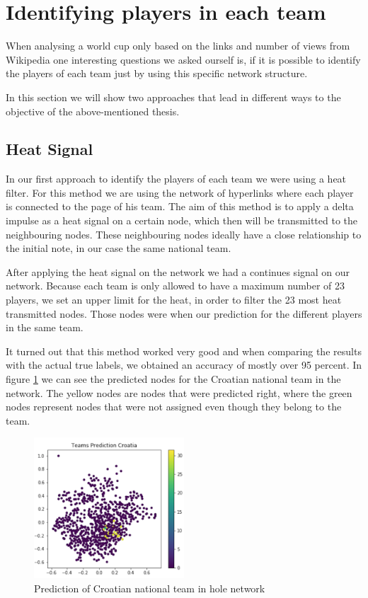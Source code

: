 \documentclass[12pt,a4paper, twocolumn]{article}
\begin{document}
\section{Identifying players in each team}
When analysing a world cup only based on the links and number of views from Wikipedia one interesting questions we asked ourself is, if it is possible to identify the players of each team just by using this specific network structure. 

In this section we will show two approaches that lead in different ways to the objective of the above-mentioned thesis. 

\subsection{Heat Signal}
In our first approach to identify the players of each team we were using a heat filter. For this method we are using the network of hyperlinks where each player is connected to the page of his team. The aim of this method is to apply a delta impulse as a heat signal on a certain node, which then will be transmitted to the neighbouring nodes. These neighbouring nodes ideally have a close relationship to the initial note, in our case the same national team. 
\par
After applying the heat signal on the network we had a continues signal on our network. Because each team is only allowed to have a maximum number of 23 players, we set an upper limit for the heat, in order to filter the 23 most heat transmitted nodes. Those nodes were when our prediction for the different players in the same team. 
\par
It turned out that this method worked very good and when comparing the results with the actual true labels, we obtained an accuracy of mostly over 95 percent. In figure \ref{fig:cluster_4} we can see the predicted nodes for the Croatian national team in the network. The yellow nodes are nodes that were predicted right, where the green nodes represent nodes that were not assigned even though they belong to the team.  

\begin{figure}[h!]
	\centering
	\includegraphics[width=0.5\textwidth]{ClusterCroatia.png}
	\caption{Prediction of Croatian national team in hole network}
	\label{fig:cluster_4}
\end{figure}
\end{document}
